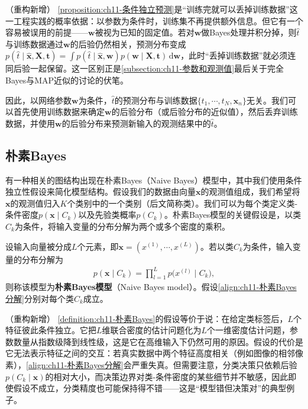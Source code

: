 \documentclass[../../main.tex]{subfiles}
\begin{document}
\begin{remark}（重构新增）
\cref{proposition:ch11-条件独立预测}是“训练完就可以丢掉训练数据”这一工程实践的概率依据：以参数为条件时，训练集不再提供额外信息。但它有一个容易被误用的前提——$\mathbf{w}$被视为已知的固定值。若对$\mathbf{w}$做Bayes处理并积分掉，则$\hat{t}$与训练数据通过$\mathbf{w}$的后验仍然相关，预测分布变成$p(\hat{t}\mid\hat{\mathbf{x}},\mathbf{X},\mathbf{t})=\int p(\hat{t}\mid\hat{\mathbf{x}},\mathbf{w})p(\mathbf{w}\mid\mathbf{X},\mathbf{t})\,\mathrm{d}\mathbf{w}$，此时“丢掉训练数据”就必须连同后验一起保留。这一区别正是\cref{subsection:ch11-参数和观测值}最后关于完全Bayes与MAP近似的讨论的伏笔。
\end{remark}

因此，以网络参数$\mathbf{w}$为条件，$\hat{t}$的预测分布与训练数据$\{t_1,\cdots,t_N,\mathbf{x}_n\}$无关。我们可以首先使用训练数据来确定$\mathbf{w}$的后验分布（或后验分布的近似值），然后丢弃训练数据，并使用$\mathbf{w}$的后验分布来预测新输入的观测结果中的$\hat{t}$。

\subsection{朴素Bayes}\label{subsection:ch11-朴素Bayes}

有一种相关的图结构出现在朴素Bayes（Naive Bayes）模型中，其中我们使用条件独立性假设来简化模型结构。假设我们的数据由向量$\mathbf{x}$的观测值组成，我们希望将$\mathbf{x}$的观测值归入$K$个类别中的一个类别（后文简称类）。我们可以为每个类定义类-条件密度$p(\mathbf{x}\mid C_k)$以及先验类概率$p(C_k)$。朴素Bayes模型的关键假设是，以类$C_k$为条件，将输入变量的分布分解为两个或多个密度的乘积。

\begin{definition}[朴素Bayes模型]\label{definition:ch11-朴素Bayes}
设输入向量被分成$L$个元素，即$\mathbf{x}=(x^{(1)},\cdots,x^{(L)})$。若以类$C_k$为条件，输入变量的分布分解为
\begin{align}
  p(\mathbf{x}\mid C_k) = \prod_{l=1}^{L}p\bigl(x^{(l)}\mid C_k\bigr),
  \label{align:ch11-朴素Bayes分解}
\end{align}
则称该模型为\textbf{朴素Bayes模型}（Naive Bayes model）。假设\eqref{align:ch11-朴素Bayes分解}分别对每个类$C_k$成立。
\end{definition}

\begin{remark}（重构新增）
\cref{definition:ch11-朴素Bayes}的假设等价于说：在给定类标签后，$L$个特征彼此条件独立。它把$L$维联合密度的估计问题化为$L$个一维密度估计问题，参数数量从指数级降到线性级，这是它在高维输入下仍然可用的原因。假设的代价是它无法表示特征之间的交互：若真实数据中两个特征高度相关（例如图像的相邻像素），\eqref{align:ch11-朴素Bayes分解}会严重失真。但需要注意，分类决策只依赖后验$p(C_k\mid\mathbf{x})$的相对大小，而决策边界对类-条件密度的某些细节并不敏感，因此即使假设不成立，分类精度也可能保持得不错——这是“模型错但决策对”的典型例子。
\end{remark}
\end{document}
